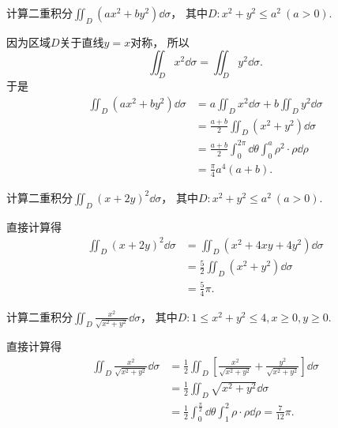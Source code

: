 \begin{example}
计算二重积分\(\iint_D (a x^2 + b y^2) \dd\sigma\)，
其中\(D: x^2 + y^2 \leq a^2\ (a>0)\).
\begin{solution}
因为区域\(D\)关于直线\(y=x\)对称，
所以\begin{equation*}
	\iint_D x^2 \dd\sigma = \iint_D y^2 \dd\sigma.
\end{equation*}
于是\begin{align*}
	\iint_D (a x^2 + b y^2) \dd\sigma
	&= a \iint_D x^2 \dd\sigma + b \iint_D y^2 \dd\sigma \\
	&= \frac{a+b}2 \iint_D (x^2 + y^2) \dd\sigma \\
	&= \frac{a+b}2 \int_0^{2\pi} \dd\theta \int_0^a \rho^2 \cdot \rho \dd\rho \\
	&= \frac\pi4 a^4 (a+b).
\end{align*}
\end{solution}
\end{example}
\begin{example}
计算二重积分\(\iint_D (x+2y)^2 \dd\sigma\)，
其中\(D: x^2 + y^2 \leq a^2\ (a>0)\).
\begin{solution}
直接计算得\begin{align*}
	\iint_D (x+2y)^2 \dd\sigma
	&= \iint_D (x^2+4xy+4y^2) \dd\sigma \\ %
	&= \frac52 \iint_D (x^2+y^2) \dd\sigma \\
	&= \frac54 \pi.
\end{align*}
\end{solution}
\end{example}
\begin{example}
计算二重积分\(\iint_D \frac{x^2}{\sqrt{x^2+y^2}} \dd\sigma\)，
其中\(D: 1 \leq x^2+y^2 \leq 4, x\geq0, y\geq0\).
\begin{solution}
直接计算得\begin{align*}
	\iint_D \frac{x^2}{\sqrt{x^2+y^2}} \dd\sigma
	&= \frac12 \iint_D \left[ \frac{x^2}{\sqrt{x^2+y^2}} + \frac{y^2}{\sqrt{x^2+y^2}} \right] \dd\sigma \\
	&= \frac12 \iint_D \sqrt{x^2+y^2} \dd\sigma \\
	&= \frac12 \int_0^{\frac\pi2} \dd\theta \int_1^2 \rho \cdot \rho \dd\rho
	= \frac{7}{12} \pi.
\end{align*}
\end{solution}
\end{example}
